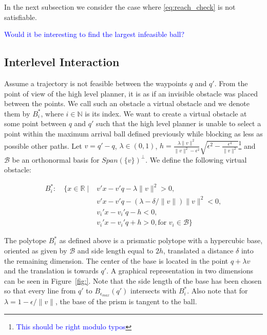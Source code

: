 \documentclass[12pt]{article}
\newcommand\fran[1]{\textcolor{blue}{#1}}
\newcommand\ffran[1]{\textcolor{blue}{\footnote{\fran{#1}}}}
\begin{document}
In the next subsection we consider the case where \ref{eq:reach_check} is not satisfiable.

\fran{Would it be interesting to find the largest infeasible ball?}

\subsection{Interlevel Interaction}
\label{sub:interlevel_interaction}

Assume a trajectory is not feasible between the waypoints $q$ and $q'$. From the point of view of the high level planner, it is as if an invisible obstacle was placed between the points. We call such an obstacle a virtual obstacle and we denote them by $B^*_i$, where $i \in \mathbb{N}$ is its index. We want to create a virtual obstacle at some point between $q$ and $q'$ such that the high level planner is unable to select a point within the maximum arrival ball defined previously while blocking as less as possible other paths. Let $v = q' - q$, $\lambda \in (0, 1)$, $h = \frac{\lambda \|v\|^2}{\|v\|^2 - \epsilon^2} \sqrt{\epsilon^2 - \frac{\epsilon^4}{\|v\|^2}}$\ffran{This should be right modulo typos} and $\mathcal{B}$ be an orthonormal basis for $Span(\{v\})^{\bot}$. We define the following virtual obstacle:

\begin{equation}
    \label{eq:virtual_obst}
    \begin{split}
        B^*_i : \quad \{x \in \mathbb{R} \mid &v'x - v'q - \lambda \|v\|^2 > 0, \\
                                              &v'x - v'q - (\lambda - \delta / \|v\|) \|v\|^2 < 0, \\
                                              &v_i'x - v_i'q - h < 0, \\
                                              &v_i'x - v_i'q + h > 0, \text{for } v_i \in \mathcal{B} \}
    \end{split}
\end{equation}

The polytope $B^*_i$ as defined above is a prismatic polytope with a hypercubic base, oriented as given by $\mathcal{B}$ and side length equal to $2 h$, translated a distance $\delta$ into the remaining dimension. The center of the base is located in the point $q + \lambda v$ and the translation is towards $q'$. A graphical representation in two dimensions can be seen in Figure~\ref{fig:}. Note that the side length of the base has been chosen so that every line from $q'$ to $B_{\epsilon_{max}}(q')$ intersects with $B^*_i$. Also note that for $\lambda = 1 - \epsilon / \|v\|$, the base of the prism is tangent to the ball.
\end{document}
